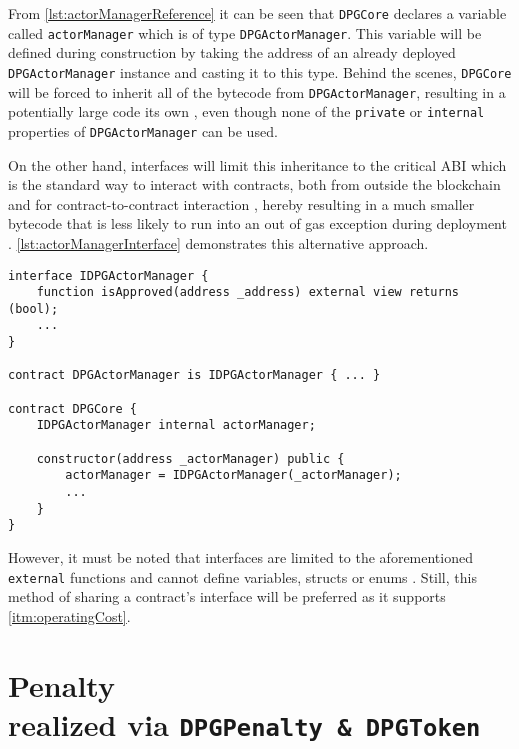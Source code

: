 From \autoref{lst:actorManagerReference} it can be seen that \texttt{DPGCore} declares a variable called \texttt{actorManager} which is of type \texttt{DPGActorManager}. This variable will be defined during construction by taking the address of an already deployed \texttt{DPGActorManager} instance and casting it to this type. Behind the scenes, \texttt{DPGCore} will be forced to inherit all of the bytecode from \texttt{DPGActorManager}, resulting in a potentially large code its own \cite{interfaces}, even though none of the \texttt{private} or \texttt{internal} properties of \texttt{DPGActorManager} can be used. 

On the other hand, interfaces will limit this inheritance to the critical \ac{ABI} which is the standard way to interact with contracts, both from outside the blockchain and for contract-to-contract interaction \cite[pp.~93, 133]{solidityDocs}, hereby resulting in a much smaller bytecode that is less likely to run into an out of gas exception during deployment \cite{interfaces}. \autoref{lst:actorManagerInterface} demonstrates this alternative approach. 

\pagebreak

\begin{lstlisting}[language=Solidity, caption=Communication via interfaces, label=lst:actorManagerInterface]
interface IDPGActorManager {
    function isApproved(address _address) external view returns (bool);
    ...
}

contract DPGActorManager is IDPGActorManager { ... }

contract DPGCore {
	IDPGActorManager internal actorManager;
	
	constructor(address _actorManager) public {
        actorManager = IDPGActorManager(_actorManager);
        ...
    }
}
\end{lstlisting}

However, it must be noted that interfaces are limited to the aforementioned \texttt{external} functions and cannot define variables, structs or enums \cite[p.~92]{solidityDocs}. Still, this method of sharing a contract's interface will be preferred as it supports \ref{itm:operatingCost}.

\pagebreak

\section[Penalty]{Penalty \\ {\normalsize realized via \texttt{DPGPenalty \& DPGToken}}}

